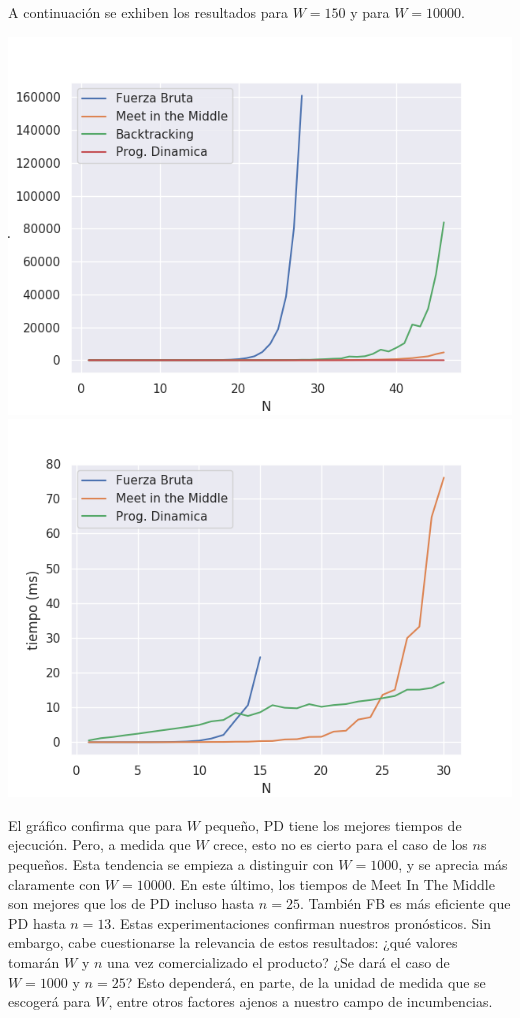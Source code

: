 \documentclass[a4paper]{article}
\begin{document}
 A continuación se exhiben los resultados para $W = 150$ y para $W = 10000$.

\begin{center}
	\includegraphics[scale=0.415]{todos150.png}
	\includegraphics[scale=0.415]{10kfbYmitmVspd.png}
\end{center}

El gráfico confirma que para $W$ pequeño, PD tiene los mejores tiempos de ejecución. Pero, a medida que $W$ crece, esto no es cierto para el caso de los $n$s pequeños. Esta tendencia se empieza a distinguir con $W=1000$, y se aprecia más claramente con $W=10000$. En este último, los tiempos de Meet In The Middle son mejores que los de PD incluso hasta $n = 25$. También FB es más eficiente que PD hasta $n=13$. Estas experimentaciones confirman nuestros pronósticos. Sin embargo, cabe cuestionarse la relevancia de estos resultados: ¿qué valores tomarán $W$ y $n$ una vez comercializado el producto? ¿Se dará el caso de $W=1000$ y $n=25$? Esto dependerá, en parte, de la unidad de medida que se escogerá para $W$, entre otros factores ajenos a nuestro campo de incumbencias.   
\end{document}
